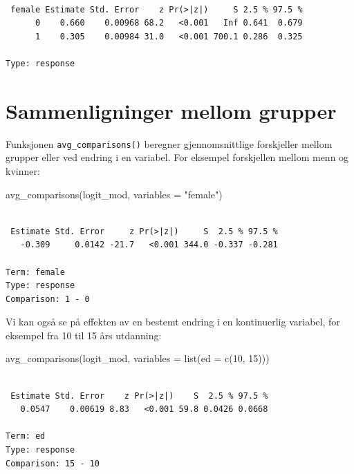 \documentclass[
  norsk,
  letterpaper,
  DIV=11,
  numbers=noendperiod]{scrreprt}
\newenvironment{Shaded}{\begin{snugshade}}{\end{snugshade}}
\newcommand{\AttributeTok}[1]{\textcolor[rgb]{0.40,0.45,0.13}{#1}}
\newcommand{\DecValTok}[1]{\textcolor[rgb]{0.68,0.00,0.00}{#1}}
\newcommand{\FunctionTok}[1]{\textcolor[rgb]{0.28,0.35,0.67}{#1}}
\newcommand{\NormalTok}[1]{\textcolor[rgb]{0.00,0.23,0.31}{#1}}
\newcommand{\StringTok}[1]{\textcolor[rgb]{0.13,0.47,0.30}{#1}}
\theoremstyle{definition}
\theoremstyle{remark}
\begin{document}
\begin{verbatim}

 female Estimate Std. Error    z Pr(>|z|)     S 2.5 % 97.5 %
      0    0.660    0.00968 68.2   <0.001   Inf 0.641  0.679
      1    0.305    0.00984 31.0   <0.001 700.1 0.286  0.325

Type: response
\end{verbatim}

\section{Sammenligninger mellom
grupper}\label{sammenligninger-mellom-grupper}

Funksjonen \texttt{avg\_comparisons()} beregner gjennomsnittlige
forskjeller mellom grupper eller ved endring i en variabel. For eksempel
forskjellen mellom menn og kvinner:

\begin{Shaded}
\begin{Highlighting}[]
\FunctionTok{avg\_comparisons}\NormalTok{(logit\_mod, }\AttributeTok{variables =} \StringTok{"female"}\NormalTok{)}
\end{Highlighting}
\end{Shaded}

\begin{verbatim}

 Estimate Std. Error     z Pr(>|z|)     S  2.5 % 97.5 %
   -0.309     0.0142 -21.7   <0.001 344.0 -0.337 -0.281

Term: female
Type: response
Comparison: 1 - 0
\end{verbatim}

Vi kan også se på effekten av en bestemt endring i en kontinuerlig
variabel, for eksempel fra 10 til 15 års utdanning:

\begin{Shaded}
\begin{Highlighting}[]
\FunctionTok{avg\_comparisons}\NormalTok{(logit\_mod,}
                \AttributeTok{variables =} \FunctionTok{list}\NormalTok{(}\AttributeTok{ed =} \FunctionTok{c}\NormalTok{(}\DecValTok{10}\NormalTok{, }\DecValTok{15}\NormalTok{)))}
\end{Highlighting}
\end{Shaded}

\begin{verbatim}

 Estimate Std. Error    z Pr(>|z|)    S  2.5 % 97.5 %
   0.0547    0.00619 8.83   <0.001 59.8 0.0426 0.0668

Term: ed
Type: response
Comparison: 15 - 10
\end{verbatim}
\end{document}
